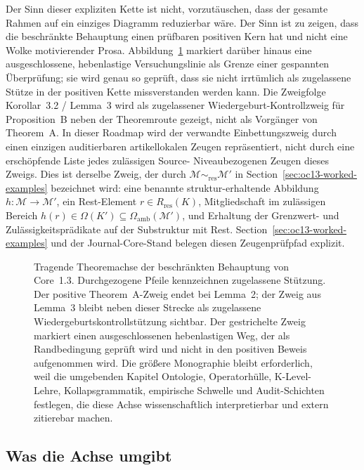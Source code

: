 Der Sinn dieser expliziten Kette ist nicht, vorzutäuschen, dass der gesamte Rahmen auf ein einziges
Diagramm reduzierbar wäre. Der Sinn ist zu zeigen, dass die beschränkte Behauptung einen prüfbaren
positiven Kern hat und nicht eine Wolke motivierender Prosa. Abbildung~\ref{fig:oc13-theorem-spine}
markiert darüber hinaus eine ausgeschlossene, hebenlastige Versuchungslinie als Grenze einer
gespannten Überprüfung; sie wird genau so geprüft, dass sie nicht irrtümlich als zugelassene Stütze in der
positiven Kette missverstanden werden kann. Die Zweigfolge Korollar~3.2 / Lemma~3 wird als zugelassener
Wiedergeburt-Kontrollzweig für Proposition~B neben der Theoremroute gezeigt, nicht als Vorgänger von
Theorem~A. In dieser Roadmap wird der verwandte Einbettungszweig durch einen einzigen auditierbaren
artikellokalen Zeugen repräsentiert, nicht durch eine erschöpfende Liste jedes zulässigen Source-
Niveaubezogenen Zeugen dieses Zweigs. Dies ist derselbe Zweig, der durch
\(\mathcal{M}\sim_{\mathrm{res}}\mathcal{M}'\) in
Section~\ref{sec:oc13-worked-examples} bezeichnet wird: eine benannte struktur-erhaltende Abbildung
\(h:\mathcal{M}\to\mathcal{M}'\), ein Rest-Element
\(r\in R_{\mathrm{res}}(K)\),
Mitgliedschaft im zulässigen Bereich
\(h(r)\in\Omega(K')\subseteq\Omega_{\mathrm{amb}}(\mathcal{M}')\),
und Erhaltung der Grenzwert- und Zulässigkeitsprädikate auf der Substruktur mit Rest. Section~\ref{sec:oc13-worked-examples}
und der Journal-Core-Stand belegen diesen Zeugenprüfpfad explizit.

\begin{figure}[htbp]
\centering

\caption{Tragende Theoremachse der beschränkten Behauptung von Core~1.3. Durchgezogene Pfeile
kennzeichnen zugelassene Stützung. Der positive Theorem~A-Zweig endet bei Lemma~2; der Zweig aus
Lemma~3 bleibt neben dieser Strecke als zugelassene Wiedergeburtskontrollstützung sichtbar.
Der gestrichelte Zweig markiert einen ausgeschlossenen hebenlastigen Weg, der als Randbedingung geprüft
wird und nicht in den positiven Beweis aufgenommen wird. Die größere Monographie bleibt erforderlich,
weil die umgebenden Kapitel Ontologie, Operatorhülle, K-Level-Lehre, Kollapsgrammatik, empirische
Schwelle und Audit-Schichten festlegen, die diese Achse wissenschaftlich interpretierbar und extern
zitierebar machen.}
\label{fig:oc13-theorem-spine}
\end{figure}

\subsection{Was die Achse umgibt}


